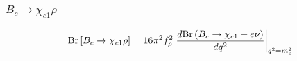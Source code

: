 \documentclass{beamer}
\begin{document}
\begin{frame}[t]
\begin{columns}
\begin{column}{0.5\textwidth}
    \end{column}
  \end{columns}
\end{frame}


\begin{frame}
  \frametitle{$B_c \to \chi_{c1} \rho$}
  $$
  \mathrm{Br}\left[B_c \to \chi_{c1} \rho\right] =
  16\pi^2 f_\rho^2 \left.
    \frac{d\mathrm{Br}\left(B_c\to\chi_{c1}+e\nu\right)}{dq^2}
  \right|_{q^2=m_\rho^2}
  $$
  \begin{columns}
    \begin{column}{0.5\textwidth}
      \vspace{3mm}
      
    \end{column}
  \begin{column}{0.5\textwidth}
      \\
      \vspace{3mm}
      
    \end{column}
\end{columns}
\end{frame}
\end{document}

